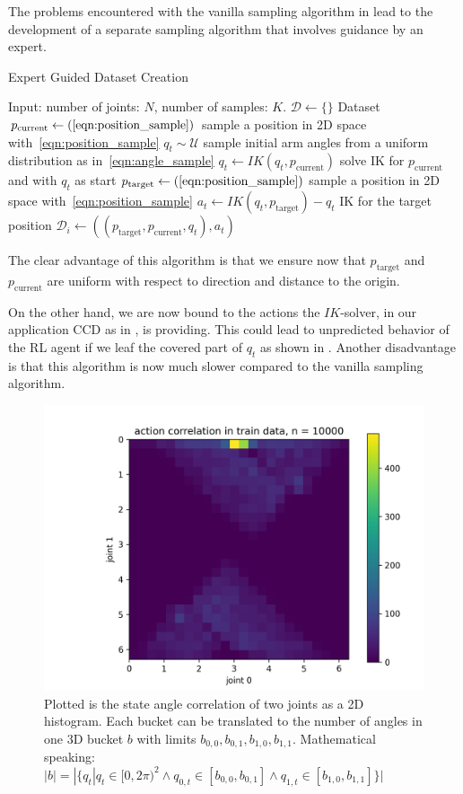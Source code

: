 The problems encountered with the vanilla sampling algorithm in  lead to the development of a separate sampling algorithm that involves guidance by an expert. 

\begin{algorithm}
    \caption{Expert Guided Dataset Creation}\label{alg:Expert_Dataset}
    \begin{algorithmic}
        \State{} Input: number of joints: $N$, number of samples: $K$.
        \State{} $\mathcal{D} \leftarrow \{\}$  Dataset
            \State{} $p_{\text{current}} \leftarrow (\text{\ref{eqn:position_sample}})$ sample a position in 2D space with~\eqref{eqn:position_sample}
            \State{} $q_t \sim \mathcal{U}$ sample initial arm angles from a uniform distribution as in~\eqref{eqn:angle_sample}
            \State{} $q_t \leftarrow IK(q_t, p_{\text{current}})$ solve IK for $p_{\text{current}}$ and with $q_t$ as start
            \State{} $p_{\text{target}} \leftarrow (\text{\ref{eqn:position_sample}})$ sample a position in 2D space with~\eqref{eqn:position_sample}
            \State{} $a_t \leftarrow IK(q_t, p_{\text{target}}) - q_t$ IK for the target position
            \State{} $\mathcal{D}_i \leftarrow ((p_{\text{target}}, p_{\text{current}}, q_t), a_t)$
        \EndFor{}
\end{algorithmic}
\end{algorithm}
The clear advantage of this algorithm is that we ensure now that $p_{\text{target}}$ and $p_{\text{current}}$ are uniform with respect to direction and distance to the origin.

On the other hand, we are now bound to the actions the $IK$-solver, in our application CCD as in , is providing. This could lead to unpredicted behavior of the RL agent if we leaf the covered part of $q_t$ as shown in . Another disadvantage is that this algorithm is now much slower compared to the vanilla sampling algorithm. 
\begin{figure}
    \begin{center}
        \includegraphics[width=0.46 \linewidth]{figures/methodology/dataset/action_correlation.png}
    \end{center}
    \caption[action correlation CCD]{Plotted is the state angle correlation of two joints as a 2D histogram. Each bucket can be translated to the number of angles in one 3D bucket $b$ with limits $b_{0, 0}, b_{0, 1}, b_{1, 0}, b_{1, 1}$. Mathematical speaking: $|b| = |\{q_t | q_t \in [0, 2\pi)^2 \land q_{0, t} \in [b_{0, 0}, b_{0, 1}] \land q_{1, t} \in [b_{1, 0}, b_{1, 1}]\}|$}
    \label{fig:dataset_action_correlation}
\end{figure}

